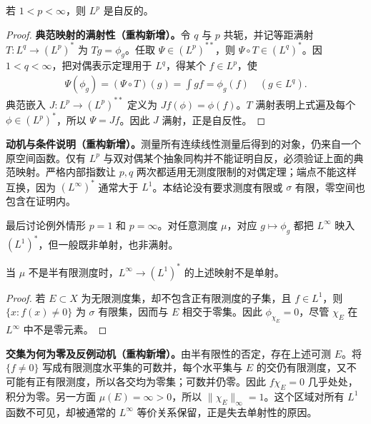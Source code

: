 \documentclass[../../main.tex]{subfiles}
\begin{document}
\begin{corollary}\label{corollary:ch06-lp-reflexive}
若 $1<p<\infty$，则 $L^p$ 是自反的。
\end{corollary}
\begin{proof}
\textbf{典范映射的满射性（重构新增）。}令 $q$ 与 $p$ 共轭，并记等距满射 $T:L^q\to(L^p)^*$ 为 $Tg=\phi_g$。任取 $\Psi\in(L^p)^{**}$，则 $\Psi\circ T\in(L^q)^*$。因 $1<q<\infty$，把对偶表示定理用于 $L^q$，得某个 $f\in L^p$，使
\begin{align*}
\Psi(\phi_g)=(\Psi\circ T)(g)=\int gf=\phi_g(f)
\quad(g\in L^q).
\end{align*}
典范嵌入 $J:L^p\to(L^p)^{**}$ 定义为 $Jf(\phi)=\phi(f)$。$T$ 满射表明上式遍及每个 $\phi\in(L^p)^*$，所以 $\Psi=Jf$。因此 $J$ 满射，正是自反性。
\end{proof}
\begin{remark}
\textbf{动机与条件说明（重构新增）。}测量所有连续线性测量后得到的对象，仍来自一个原空间函数。仅有 $L^p$ 与双对偶某个抽象同构并不能证明自反，必须验证上面的典范映射。严格内部指数让 $p,q$ 两次都适用无测度限制的对偶定理；端点不能这样互换，因为 $(L^\infty)^*$ 通常大于 $L^1$。本结论没有要求测度有限或 $\sigma$ 有限，零空间也包含在证明内。
\end{remark}
最后讨论例外情形 $p=1$ 和 $p=\infty$。对任意测度 $\mu$，对应 $g\mapsto\phi_g$ 都把 $L^\infty$ 映入 $(L^1)^*$，但一般既非单射，也非满射。
\begin{example}\label{example:ch06-nonsemifinite-pairing}
当 $\mu$ 不是半有限测度时，$L^\infty\to(L^1)^*$ 的上述映射不是单射。
\end{example}
\begin{proof}
若 $E\subset X$ 为无限测度集，却不包含正有限测度的子集，且 $f\in L^1$，则 $\{x:f(x)\ne0\}$ 为 $\sigma$ 有限集，因而与 $E$ 相交于零集。因此 $\phi_{\chi_E}=0$，尽管 $\chi_E$ 在 $L^\infty$ 中不是零元素。
\end{proof}
\begin{remark}
\textbf{交集为何为零及反例动机（重构新增）。}由半有限性的否定，存在上述可测 $E$。将 $\{f\ne0\}$ 写成有限测度水平集的可数并，每个水平集与 $E$ 的交仍有限测度，又不可能有正有限测度，所以各交均为零集；可数并仍零。因此 $f\chi_E=0$ 几乎处处，积分为零。另一方面 $\mu(E)=\infty>0$，所以 $\|\chi_E\|_\infty=1$。这个区域对所有 $L^1$ 函数不可见，却被通常的 $L^\infty$ 等价关系保留，正是失去单射性的原因。
\end{remark}
\end{document}
